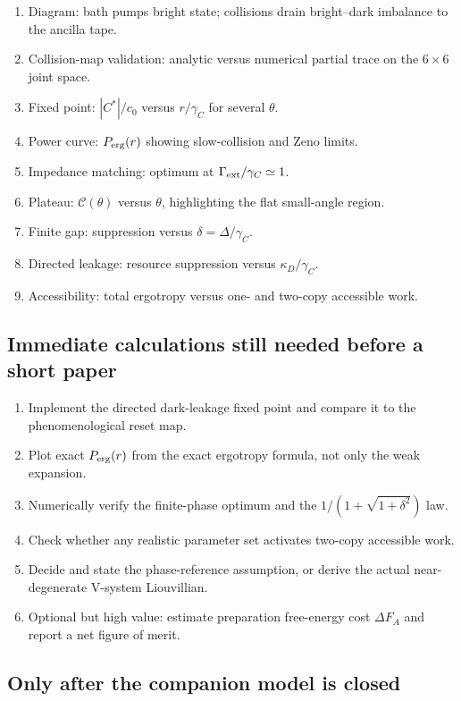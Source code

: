 \documentclass[11pt,a4paper]{article}
\begin{document}
\begin{enumerate}
\item Diagram: bath pumps bright state; collisions drain bright--dark imbalance to the ancilla tape.
\item Collision-map validation: analytic versus numerical partial trace on the $6\times6$ joint space.
\item Fixed point: $|C^*|/c_0$ versus $r/\gamma_C$ for several $\theta$.
\item Power curve: $P_{\rm erg}(r)$ showing slow-collision and Zeno limits.
\item Impedance matching: optimum at $\Gamma_{\rm ext}/\gamma_C\simeq1$.
\item Plateau: $\mathcal C(\theta)$ versus $\theta$, highlighting the flat small-angle region.
\item Finite gap: suppression versus $\delta=\Delta/\gamma_C$.
\item Directed leakage: resource suppression versus $\kappa_D/\gamma_C$.
\item Accessibility: total ergotropy versus one- and two-copy accessible work.
\end{enumerate}

\subsection{Immediate calculations still needed before a short paper}

\begin{enumerate}
\item Implement the directed dark-leakage fixed point and compare it to the phenomenological reset map.
\item Plot exact $P_{\rm erg}(r)$ from the exact ergotropy formula, not only the weak expansion.
\item Numerically verify the finite-phase optimum and the $1/(1+\sqrt{1+\delta^2})$ law.
\item Check whether any realistic parameter set activates two-copy accessible work.
\item Decide and state the phase-reference assumption, or derive the actual near-degenerate V-system Liouvillian.
\item Optional but high value: estimate preparation free-energy cost $\Delta F_A$ and report a net figure of merit.
\end{enumerate}

\subsection{Only after the companion model is closed}
\end{document}
